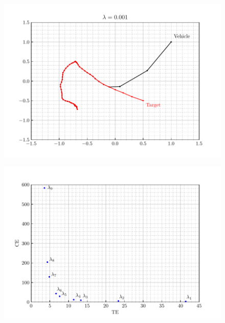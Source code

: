 \documentclass[12pt]{article}
\begin{document}
\begin{figure}[H]
    \centering
    \includegraphics{../../src/task_1/output/ex_1_i=9.pdf}
\end{figure}

\begin{figure}[H]
    \centering
    \includegraphics{../../src/task_1/output/TEvsCE.pdf}
\end{figure}
\end{document}
